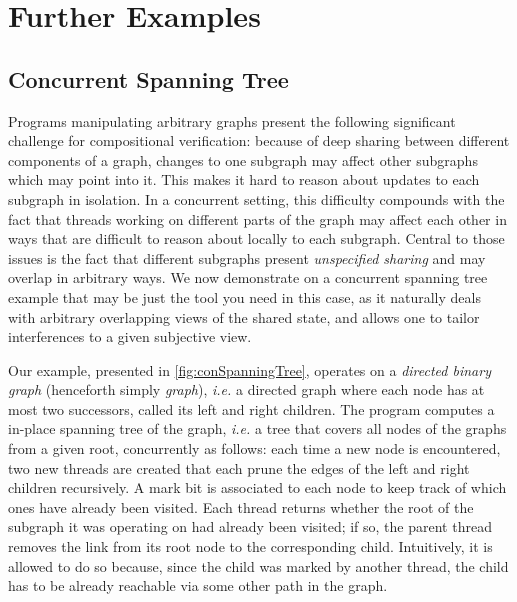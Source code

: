 \vspace{-.5ex}
\section{Further Examples}\label{sec:examples}
\vspace{-.5ex}

\vspace{-.5ex}
\subsection{Concurrent Spanning Tree}\label{subsec:CSTExample}
\vspace{-.5ex}

Programs manipulating arbitrary graphs present the following significant
challenge for compositional verification: because of deep sharing
between different components of a graph, changes to one subgraph may
affect other subgraphs which may point into it. This makes it hard to
reason about updates to each subgraph in isolation. In a concurrent
setting, this difficulty compounds with the fact that threads working
on different parts of the graph may affect each other in ways that are
difficult to reason about locally to each subgraph. Central to those
issues is the fact that different subgraphs present \emph{unspecified
  sharing} and may overlap in arbitrary ways. We now demonstrate on a
concurrent spanning tree example that \colosl may be just the tool you
need in this case, as it naturally deals with arbitrary overlapping
views of the shared state, and allows one to tailor interferences to a
given subjective view.

Our example, presented in \fig\ref{fig:conSpanningTree}, operates on a
\emph{directed binary graph} (henceforth simply \emph{graph}),
\textit{i.e.} a directed graph where each node has at most two
successors, called its left and right children. The program computes a
in-place spanning tree of the graph, \textit{i.e.} a tree that covers
all nodes of the graphs from a given root, concurrently as follows:
each time a new node is encountered, two new threads are created that
each prune the edges of the left and right children recursively. A
mark bit is associated to each node to keep track of which ones have
already been visited. Each thread returns whether the root
of the subgraph it was operating on had already been visited; if so,
the parent thread removes the link from its root node to the
corresponding child. Intuitively, it is allowed to do so because,
since the child was marked by another thread, the child has to be
already reachable via some other path in the graph.

